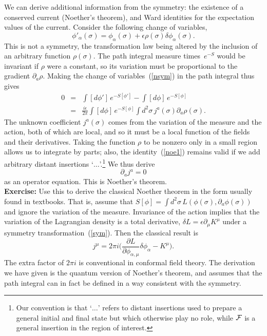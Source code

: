 We can derive additional information from the
symmetry: the existence of a conserved current (Noether's theorem),
and Ward identities for the expectation values of the current.
Consider the following change of variables,
\begin{equation}
\phi'_\alpha(\sigma)
= \phi_\alpha(\sigma) + \epsilon\rho(\sigma)
\delta\phi_\alpha(\sigma).
\label{nsym}
\end{equation}
This is not a symmetry, the transformation law being altered by the
inclusion of an arbitrary function $\rho(\sigma)$.  The path integral
measure times~$e^{-S}$
would be invariant if $\rho$ were a constant, so its variation
must be proportional to the gradient $\partial_a \rho$.  Making the
change of variables~(\ref{nsym}) in the path integral thus gives
\begin{eqnarray}
0 &=& \int [d\phi']\, e^{-S[\phi']} - \int [d\phi]\, e^{-S[\phi]}
\nonumber\\
&=&
\frac{i\epsilon}{2\pi} \int [d\phi]\, e^{-S[\phi]} \int d^2\sigma\,
j^a(\sigma)
\partial_a \rho(\sigma).  \label{noe1}
\end{eqnarray}
The unknown coefficient $j^a(\sigma)$ comes from the variation of
the measure and the action, both of which are local, and so it must
be a local function of the fields and their derivatives.
Taking the function $\rho$ to be nonzero only in a small region
allows us to integrate by parts; also, the identity~(\ref{noe1})
remains valid if we add arbitrary distant insertions
`$\ldots$'.\footnote {Our convention is that `$\ldots$' refers to
distant insertions used to prepare a general initial and final state
but which otherwise play no role, while
${\cal F}$ is a general insertion in the region of interest.}
We thus derive
\begin{equation}
\partial_a j^a = 0
\end{equation}
as an operator equation.  This is Noether's theorem.\\[3pt]
{\bf Exercise:}  Use this to derive the classical Noether theorem
in the form usually found in textbooks.  That is,
assume that $S[\phi] = \int d^2 \sigma\,
L(\phi(\sigma), \partial_a \phi(\sigma))$ and ignore the variation
of the measure.  Invariance of the action implies that the variation
of the Lagrangian density is a total derivative, $\delta L
= \epsilon \partial_\mu K^\mu$ under a symmetry
transformation~(\ref{sym}).  Then the classical result is
\begin{equation}
j^\mu = 2\pi i \Biggl( \frac{\partial L}{\partial \phi_{\alpha,\mu}}
\delta \phi_\alpha - K^\mu \Biggr).
\end{equation}
The extra factor of $2\pi i$ is
conventional in conformal field theory. The derivation we have given
is the quantum version of Noether's theorem, and assumes that the path
integral can in fact be defined in a way consistent with the symmetry.

